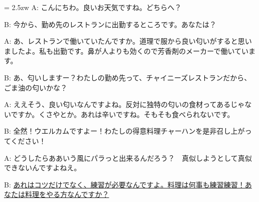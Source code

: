 \documentclass[11pt]{amsart}
\title{}
\author{}
\newenvironment{hangall}[1]{\hangindent = 2.5zw\everypar{\hangindent = 2.5zw}}{}
\begin{document}
\maketitle
\begin{hangall}{}%
A: こんにちわ。良いお天気ですね。どちらへ？

B: 今から、勤め先のレストランに出勤するところです。あなたは？

A: あ、レストランで働いていたんですか。道理で服から良い匂いがすると思いましたよ。私も出勤です。鼻が人よりも効くので芳香剤のメーカーで働いています。

B: あ、匂いしますー？わたしの勤め先って、チャイニーズレストランだから、ごま油の匂いかな？

A: ええそう、良い匂いなんですよね。反対に独特の匂いの食材ってあるじゃないですか。くさやとか。あれは辛いですね。そもそも食べられないです。

B: 全然！ウエルカムですよー！わたしの得意料理チャーハンを是非召し上がってください！

A: どうしたらああいう風にパラっと出来るんだろう？　真似しようとして真似できないんですよねえ。

B: \ul{あれはコツだけでなく、練習が必要なんですよ。料理は何事も練習練習！あなたは料理をやる方なんですか？}\end{hangall}
\end{document}
